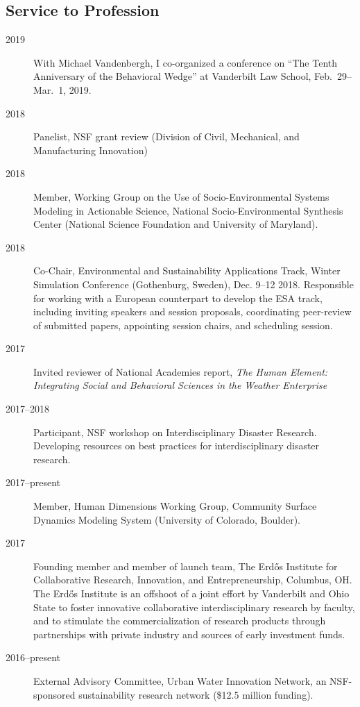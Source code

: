 \documentclass[10pt]{article}
\begin{document}
    \subsection{Service to Profession}
        \begin{description}
            \item[2019] With Michael Vandenbergh, I co-organized a conference on ``The Tenth Anniversary of the Behavioral Wedge'' at Vanderbilt Law School, Feb.~29--Mar.~1, 2019.
            \item[2018] Panelist, NSF grant review (Division of Civil, Mechanical, and Manufacturing Innovation)
            \item[2018] Member, Working Group on the Use of Socio-Environmental Systems Modeling in Actionable Science, National Socio-Environmental Synthesis Center (National Science Foundation and University of Maryland).
            \item[2018] Co-Chair, Environmental and Sustainability Applications Track, Winter Simulation Conference (Gothenburg, Sweden), Dec. 9--12 2018. Responsible for working with a European counterpart to develop the ESA track, including inviting speakers and session proposals, coordinating peer-review of submitted papers, appointing session chairs, and scheduling session.
            \item[2017] Invited reviewer of National Academies report, \emph{The Human Element: Integrating Social and Behavioral Sciences in the Weather Enterprise}
            \item[2017--2018] Participant, NSF workshop on Interdisciplinary Disaster Research. Developing resources on best practices for interdisciplinary disaster research.
            \item[2017--present] Member, Human Dimensions Working Group, Community Surface Dynamics Modeling System (University of Colorado, Boulder).
            \item[2017] Founding member and member of launch team, The Erd\H{o}s Institute for Collaborative Research, Innovation, and Entrepreneurship, Columbus, OH. The Erd\H{o}s Institute is an offshoot of
a joint effort by Vanderbilt and Ohio State to foster innovative collaborative interdisciplinary research by faculty, and to stimulate the commercialization of research products through partnerships
with private industry and sources of early investment funds.
            \item[2016--present] External Advisory Committee, Urban Water Innovation Network, an NSF-sponsored sustainability research network (\$12.5 million funding).

\end{description}
\end{document}
